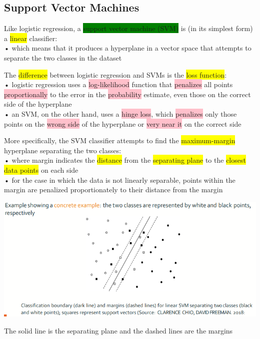 \documentclass[]{project_plan}
\begin{document}
\subsection{Support Vector Machines}

Like logistic regression, a \colorbox{green}{support vector machine (SVM)} is (in its simplest form) a \colorbox{yellow}{linear}
classifier:\\
• which means that it produces a hyperplane in a vector space that attempts to separate the two classes
in the dataset

The \colorbox{yellow}{difference} between logistic regression and SVMs is the \colorbox{yellow}{loss function}:\\
• logistic regression uses a \colorbox{pink}{log-likelihood} function that \colorbox{pink}{penalizes} all points \colorbox{pink}{proportionally} to the error in the
\colorbox{pink}{probability} estimate, even those on the correct side of the hyperplane\\
• an SVM, on the other hand, uses a \colorbox{pink}{hinge loss}, which \colorbox{pink}{penalizes} only those points on the \colorbox{pink}{wrong side} of the
hyperplane or \colorbox{pink}{very near it} on the correct side

More specifically, the SVM classifier attempts to find the \colorbox{yellow}{maximum-margin} hyperplane
separating the two classes:\\
• where margin indicates the \colorbox{yellow}{distance} from the \colorbox{yellow}{separating plane} to the \colorbox{yellow}{closest data points} on each side\\
• for the case in which the data is not linearly separable, points within the margin are penalized
proportionately to their distance from the margin

\includegraphics[width=.9\linewidth]{ml84.png}

The solid line is the separating plane and the dashed lines are
the margins
\end{document}
